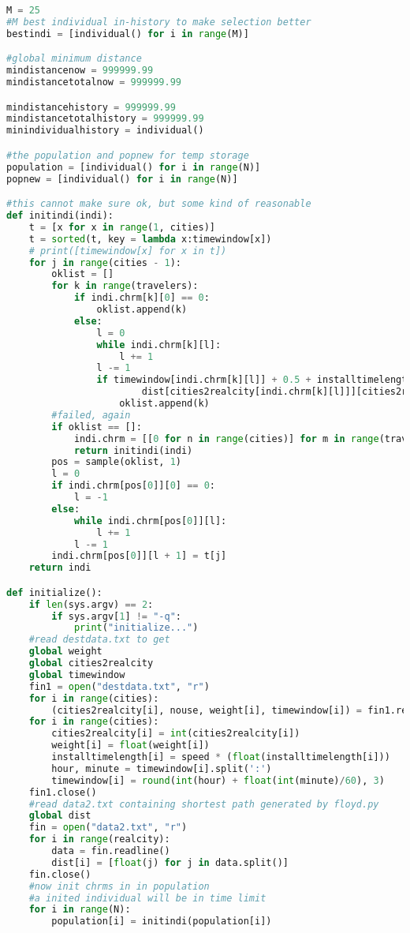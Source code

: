 \documentclass[UTF8,cs4size]{ctexart}
\begin{document}
\begin{lstlisting}[language=Python]
M = 25
#M best individual in-history to make selection better
bestindi = [individual() for i in range(M)]

#global minimum distance
mindistancenow = 999999.99
mindistancetotalnow = 999999.99

mindistancehistory = 999999.99
mindistancetotalhistory = 999999.99
minindividualhistory = individual()

#the population and popnew for temp storage
population = [individual() for i in range(N)]
popnew = [individual() for i in range(N)]

#this cannot make sure ok, but some kind of reasonable
def initindi(indi):
    t = [x for x in range(1, cities)]
    t = sorted(t, key = lambda x:timewindow[x])
    # print([timewindow[x] for x in t])
    for j in range(cities - 1):
        oklist = []
        for k in range(travelers):
            if indi.chrm[k][0] == 0:
                oklist.append(k)
            else:
                l = 0
                while indi.chrm[k][l]:
                    l += 1
                l -= 1
                if timewindow[indi.chrm[k][l]] + 0.5 + installtimelength[indi.chrm[k][l]] / speed + \
                        dist[cities2realcity[indi.chrm[k][l]]][cities2realcity[t[j]]] / speed <= timewindow[t[j]] + 0.5:
                    oklist.append(k)
        #failed, again
        if oklist == []:
            indi.chrm = [[0 for n in range(cities)] for m in range(travelers)] 
            return initindi(indi)
        pos = sample(oklist, 1)
        l = 0
        if indi.chrm[pos[0]][0] == 0:
            l = -1
        else:
            while indi.chrm[pos[0]][l]:
                l += 1
            l -= 1
        indi.chrm[pos[0]][l + 1] = t[j]
    return indi

def initialize():
    if len(sys.argv) == 2:
        if sys.argv[1] != "-q":
            print("initialize...")
    #read destdata.txt to get 
    global weight
    global cities2realcity
    global timewindow
    fin1 = open("destdata.txt", "r")
    for i in range(cities):
        (cities2realcity[i], nouse, weight[i], timewindow[i]) = fin1.readline().split()
    for i in range(cities):
        cities2realcity[i] = int(cities2realcity[i])
        weight[i] = float(weight[i])
        installtimelength[i] = speed * (float(installtimelength[i]))
        hour, minute = timewindow[i].split(':')
        timewindow[i] = round(int(hour) + float(int(minute)/60), 3)
    fin1.close()
    #read data2.txt containing shortest path generated by floyd.py
    global dist
    fin = open("data2.txt", "r")
    for i in range(realcity):
        data = fin.readline()
        dist[i] = [float(j) for j in data.split()]
    fin.close()
    #now init chrms in in population
    #a inited individual will be in time limit
    for i in range(N):
        population[i] = initindi(population[i])


\end{lstlisting}
\end{document}

